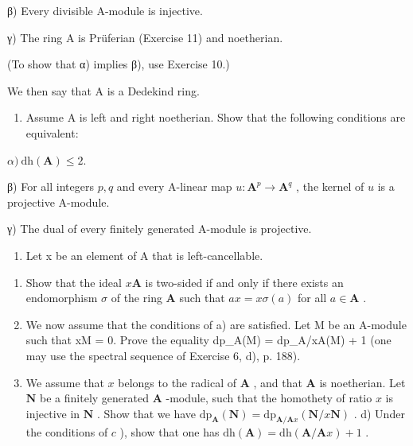 β) Every divisible A-module is injective.

γ) The ring A is Prüferian (Exercise 11) and noetherian.

(To show that α) implies β), use Exercise 10.)

We then say that A is a Dedekind ring.

\begin{enumerate}
\def\labelenumi{\arabic{enumi})}
\setcounter{enumi}{12}
\tightlist
\item
  Assume A is left and right noetherian. Show that the following conditions are equivalent:
\end{enumerate}

\(\alpha)\ \mathrm{dh}(\mathbf{A}) \leqslant 2.\)

β) For all integers \(p, q\) and every A-linear map \(u: \mathbf{A}^p \to \mathbf{A}^q\) , the kernel of \(u\) is a projective A-module.

γ) The dual of every finitely generated A-module is projective.

\begin{enumerate}
\def\labelenumi{\arabic{enumi})}
\setcounter{enumi}{13}
\tightlist
\item
  Let x be an element of A that is left-cancellable.
\end{enumerate}

\begin{enumerate}
\def\labelenumi{\alph{enumi})}
\item
  Show that the ideal \(x\mathbf{A}\) is two-sided if and only if there exists an endomorphism \(\sigma\) of the ring \(\mathbf{A}\) such that \(ax = x\sigma(a)\) for all \(a \in \mathbf{A}\) .
\item
  We now assume that the conditions of a) are satisfied. Let M be an A-module such that xM = 0. Prove the equality dp\_A(M) = dp\_{A/xA}(M) + 1 (one may use the spectral sequence of Exercise 6, d), p. 188).
\item
  We assume that \(x\) belongs to the radical of \(\mathbf{A}\) , and that \(\mathbf{A}\) is noetherian. Let \(\mathbf{N}\) be a finitely generated \(\mathbf{A}\) -module, such that the homothety of ratio \(x\) is injective in \(\mathbf{N}\) . Show that we have \(\mathrm{dp}_{\mathbf{A}}(\mathbf{N}) = \mathrm{dp}_{\mathbf{A}/\mathbf{A}x}(\mathbf{N}/x\mathbf{N})\) . d) Under the conditions of \(c\) ), show that one has \(\mathrm{dh}(\mathbf{A}) = \mathrm{dh}(\mathbf{A}/\mathbf{A}x) + 1\) .
\end{enumerate}

